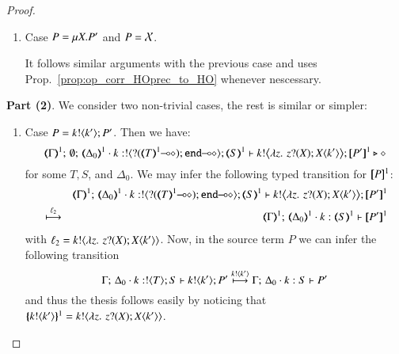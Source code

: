 \begin{proof}
\begin{enumerate}[1.]

	\item	Case $P =\mu X. P'$ and $P = \mathcal{X}$.

		It follows similar arguments with the previous case
		and uses Prop.~\ref{prop:op_corr_HOprec_to_HO} whenever nescessary.
\end{enumerate}
%
\noi \textbf{Part (2)}. We consider two non-trivial cases, the rest is similar or simpler:
%
\begin{enumerate}[1.]
	\item	Case $P = k ! \langle k' \rangle ; P'$.
		Then 
		we have: %
%
		\[
			\mapt{\Gamma}^{1};\, \emptyset;\, \mapt{\Delta_0}^{1} \cat 
			k: \btout{\lhot{\btinp{\lhot{\tmap{T}{1}}}\tinact}} \tmap{S}{1} 
			\proves 
			 \bbout{k}{ \abs{z}{\,\binp{z}{X} \appl{X}{k'}} } \pmap{P'}{1} 
			 \hastype \Proc
		\]
%
		for some $T, S$, and $\Delta_0$. 
		We may infer the following typed transition for $[\!\![P]\!\!]^{1}$:
%
		\begin{eqnarray*}
			& & \mapt{\Gamma}^{1};\, \mapt{\Delta_0}^{1} \cat k: \btout{\lhot{\btinp{\lhot{\tmap{T}{1}}}\tinact}} \tmap{S}{1} 
			\proves 
			 \bbout{k}{ \abs{z}{\,\binp{z}{X} \appl{X}{k'}} } \pmap{P'}{1} 
			 \\
			&\hby{\ell_2}& 
			\mapt{\Gamma}^{1};\, \mapt{\Delta_0}^{1} \cat k: \tmap{S}{1} 
			\proves  \pmap{P'}{1} 
		\end{eqnarray*}
%
		with $\ell_2 = k ! \langle \lambda z.\,\,z ? (X) ; X\langle k' \rangle \rangle$.
		Now, in the source term $P$ we can infer the following transition 
%
		\[
		\Gamma;\,  \Delta_0 \cdot k:! \langle T \rangle ; S \vdash k ! \langle k' \rangle ; P'
		 \stackrel{k ! \langle k' \rangle}{\longmapsto} 
		 \Gamma;\,  \Delta_0 \cdot k: S \vdash P'
		\]
%
		and thus the thesis follows easily by noticing that 
		$\{\!\!\{k ! \langle k' \rangle\}\!\!\}^{1} = k ! \langle \lambda z.\,\,z ? (X) ; X\langle k' \rangle \rangle$.



\end{enumerate}
\end{proof}
